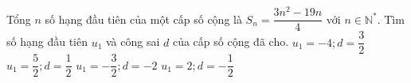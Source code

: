 \begin{ex}%
	Tổng $n$ số hạng đầu tiên của một cấp số cộng  là ${{S}_{n}}=\dfrac{3{{n}^2}-19n}{4}$ với $n\in {{\mathbb{N}}^{*}}$. Tìm số hạng đầu tiên ${{u}_{1}}$ và công sai $d$ của cấp số cộng đã cho.
	 \choice
		 { \True ${{u}_{1}}=-4;d=\dfrac{3}{2}$}
		{ ${{u}_{1}}=\dfrac{5}{2};d=\dfrac{1}{2}$} 
		{ ${{u}_{1}}=-\dfrac{3}{2};d=-2$} 
		{  ${{u}_{1}}=2;d=-\dfrac{1}{2}$}
\end{ex}
